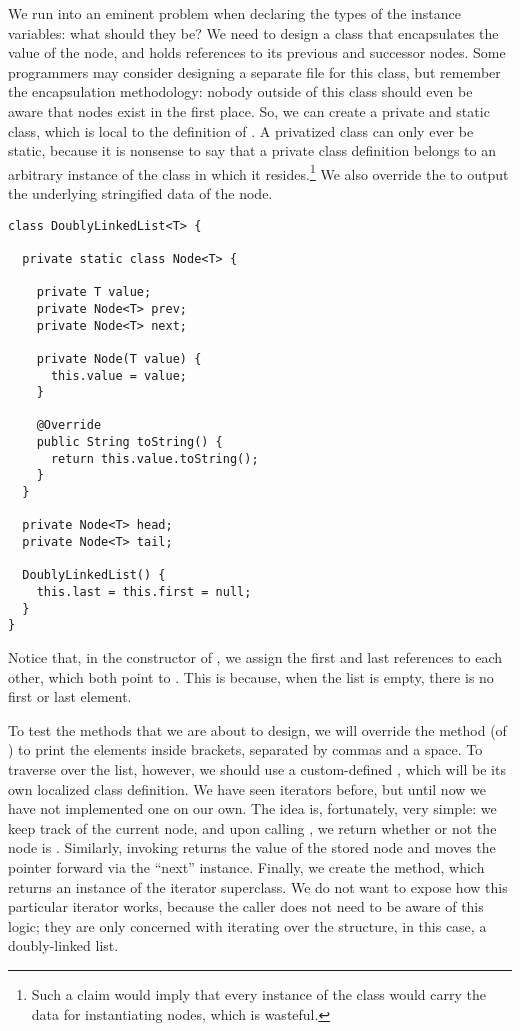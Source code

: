 We run into an eminent problem when declaring the types of the instance variables: what should they be? We need to design a class that encapsulates the value of the node, and holds references to its previous and successor nodes. Some programmers may consider designing a separate  file for this class, but remember the encapsulation methodology: nobody outside of this class should even be aware that nodes exist in the first place. So, we can create a private and static  class, which is local to the definition of . A privatized class can only ever be static, because it is nonsense to say that a private class definition belongs to an arbitrary instance of the class in which it resides.\footnote{Such a claim would imply that every instance of the  class would carry the data for instantiating nodes, which is wasteful.} We also override the  to output the underlying stringified data of the node.

\begin{lstlisting}[language=MyJava]
class DoublyLinkedList<T> {

  private static class Node<T> {

    private T value;
    private Node<T> prev;
    private Node<T> next;

    private Node(T value) { 
      this.value = value; 
    }

    @Override
    public String toString() {
      return this.value.toString();
    }
  }

  private Node<T> head;
  private Node<T> tail;

  DoublyLinkedList() {
    this.last = this.first = null;
  }
}
\end{lstlisting}

Notice that, in the constructor of , we assign the first and last references to each other, which both point to . This is because, when the list is empty, there is no first or last element.

To test the methods that we are about to design, we will override the  method (of ) to print the elements inside brackets, separated by commas and a space. To traverse over the list, however, we should use a custom-defined , which will be its own localized class definition. We have seen iterators before, but until now we have not implemented one on our own. The idea is, fortunately, very simple: we keep track of the current node, and upon calling , we return whether or not the node is . Similarly, invoking  returns the value of the stored node and moves the pointer forward via the ``next'' instance. Finally, we create the  method, which returns an instance of the iterator superclass. We do not want to expose how this particular iterator works, because the caller does not need to be aware of this logic; they are only concerned with iterating over the structure, in this case, a doubly-linked list.

